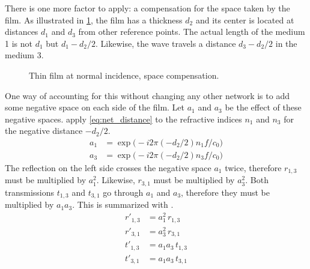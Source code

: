 There is one more factor to apply: a compensation for the space taken by the film.
As illustrated in \cref{fig:thin_film_normal_compensation},
the film has a thickness $d_2$ and
its center is located at distances $d_1$ and $d_3$ from other reference points.
The actual length of the medium 1 is not $d_1$ but $d_1 - d_2/2$.
Likewise, the wave travels a distance $d_3 - d_2/2$ in the medium 3.
\begin{figure}[hbtp]
    \centering
    
    \caption{Thin film at normal incidence, space compensation.}
    \label{fig:thin_film_normal_compensation}
\end{figure}
One way of accounting for this without changing any other network is to add some negative space on each side of the film.
Let $a_1$ and $a_3$ be the effect of these negative spaces.
 apply \cref{eq:net_distance} to the refractive indices $n_1$ and $n_3$ for the negative distance $-d_2/2$.
\begin{subequations}
    \begin{align}
        a_1 &= \exp \Big(-i 2 \pi (-d_2/2) n_1 f / c_0 \Big) \label{eq:negative_space_1}
        \\
        a_3 &= \exp \Big(-i 2 \pi (-d_2/2) n_3 f / c_0 \Big) \label{eq:negative_space_3}
    \end{align}
    \label{eq:negative_space}
\end{subequations}
The reflection on the left side crosses the negative space $a_1$ twice, therefore $r_{1, 3}$ must be multiplied by $a_1^2$.
Likewise, $r_{3, 1}$ must be multiplied by $a_3^2$.
Both transmissions $t_{1, 3}$ and $t_{3, 1}$ go through $a_1$ and $a_3$, therefore they must be multiplied by $a_1 a_3$.
This is summarized with .
\begin{subequations}
    \begin{align}
        r'_{1, 3} &= a_1^2   \, r_{1, 3} \label{eq:thin_film_normal_compensated_r13} \\
        r'_{3, 1} &= a_3^2   \, r_{3, 1} \label{eq:thin_film_normal_compensated_r31} \\
        t'_{1, 3} &= a_1 a_3 \, t_{1, 3} \label{eq:thin_film_normal_compensated_t13} \\
        t'_{3, 1} &= a_1 a_3 \, t_{3, 1} \label{eq:thin_film_normal_compensated_t31}
    \end{align}
    \label{eq:thin_film_normal_compensated}
\end{subequations}


